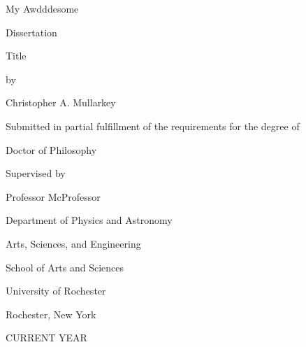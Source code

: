 \documentclass[\main/master.tex]{subfiles}
\begin{document}
\pagestyle{empty}
\begin{titlepage}
\doublespacing
\begin{center}
  {\titlefont My Awdddesome\par \vspace{10 mm}
   Dissertation \par \vspace{10 mm}
   Title}
   \vfill
   by\par
   \vfill
   Christopher A. Mullarkey\par
   \vspace{1.5in}
   Submitted in partial fulfillment of the requirements for the degree of\par
   \vfill
   Doctor of Philosophy\par
   \vfill
   Supervised by\par
   Professor McProfessor\par
   \vspace{1.5in}
   Department of Physics and Astronomy\par
   Arts, Sciences, and Engineering\par
   School of Arts and Sciences \par
   \vfill
   University of Rochester \par
   Rochester, New York \par
   CURRENT YEAR
   \end{center}
  \end{titlepage}
\end{document}
